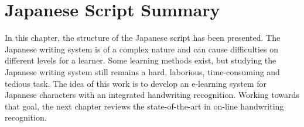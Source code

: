
\section{Japanese Script Summary}
\label{sec:jap:summary}

In this chapter, the structure of the Japanese script has been presented.
The Japanese writing system is of a complex nature and can cause difficulties
on different levels for a learner. Some learning methods exist, but studying
the Japanese writing system still remains a hard, laborious,  
time-consuming and tedious task.
The idea of this work is to develop an e-learning system for Japanese characters
with an integrated handwriting recognition.
Working towards that goal, the next chapter reviews the state-of-the-art in 
on-line handwriting recognition.
